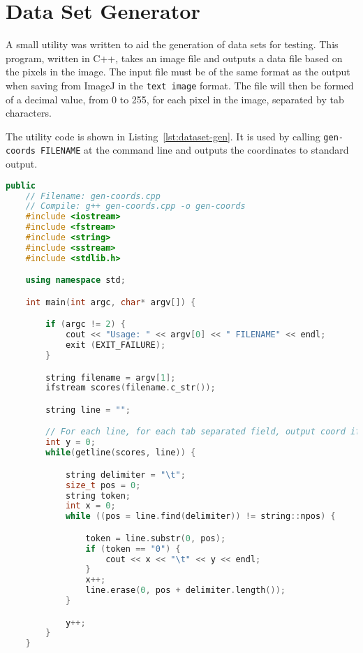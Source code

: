 
\section{Data Set Generator}
\label{sec:dataset_generator}

A small utility was written to aid the generation of data sets for testing.
This program, written in C++, takes an image file and outputs a data file based
on the pixels in the image. The input file must be of the same format as the
output when saving from ImageJ in the \texttt{text image} format. The file will
then be formed of a decimal value, from 0 to 255, for each pixel in the image,
separated by tab characters.

The utility code is shown in Listing~\ref{lst:dataset-gen}. It is used by
calling \texttt{gen-coords FILENAME} at the command line and outputs the
coordinates to standard output.

\begin{center}
\begin{minipage}{\textwidth}
	\begin{lstlisting}[caption={Utility to gen data sets from images.},
	label=lst:dataset-gen, language=c++, linewidth=12cm, firstnumber=1] public
	// Filename: gen-coords.cpp
	// Compile: g++ gen-coords.cpp -o gen-coords
	#include <iostream>
	#include <fstream>
	#include <string>
	#include <sstream>
	#include <stdlib.h>

	using namespace std;

	int main(int argc, char* argv[]) {

		if (argc != 2) {
			cout << "Usage: " << argv[0] << " FILENAME" << endl;
			exit (EXIT_FAILURE);
		}

		string filename = argv[1];
		ifstream scores(filename.c_str());

		string line = "";

		// For each line, for each tab separated field, output coord if 0.
		int y = 0;
		while(getline(scores, line)) {

			string delimiter = "\t";
			size_t pos = 0;
			string token;
			int x = 0;
			while ((pos = line.find(delimiter)) != string::npos) {

				token = line.substr(0, pos);
				if (token == "0") {
					cout << x << "\t" << y << endl;
				}
				x++;
				line.erase(0, pos + delimiter.length());
			}

			y++;
		}
	}
\end{lstlisting}
\end{minipage}
\end{center}
